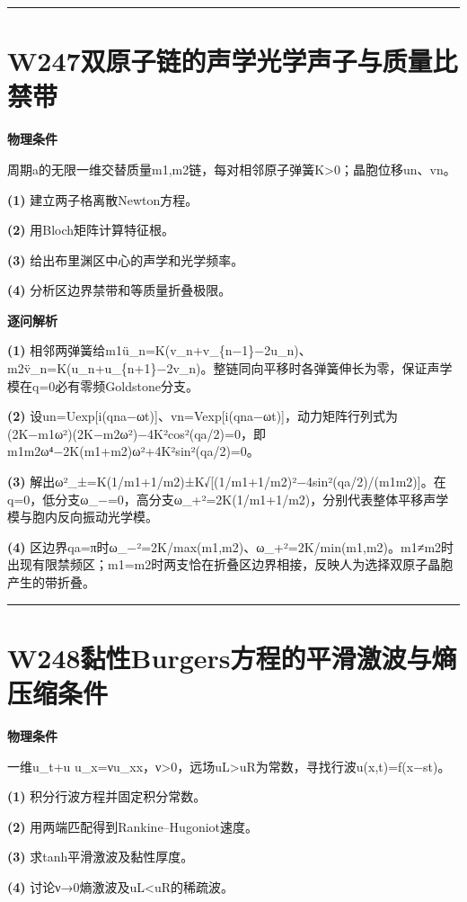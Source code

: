 \documentclass[UTF8,a4paper,11pt,oneside,openany]{ctexbook}
\begin{document}
\par\bigskip\hrule\bigskip
\section*{W247\quad 双原子链的声学光学声子与质量比禁带}
\textbf{物理条件}\par 周期a的无限一维交替质量m1,m2链，每对相邻原子弹簧K>0；晶胞位移un、vn。
\par\noindent\textbf{(1)} 建立两子格离散Newton方程。
\par\noindent\textbf{(2)} 用Bloch矩阵计算特征根。
\par\noindent\textbf{(3)} 给出布里渊区中心的声学和光学频率。
\par\noindent\textbf{(4)} 分析区边界禁带和等质量折叠极限。

\par\medskip\noindent\textbf{逐问解析}
\par\noindent\textbf{(1)} 相邻两弹簧给m1ü\_n=K(v\_n+v\_\{n−1\}−2u\_n)、m2v̈\_n=K(u\_n+u\_\{n+1\}−2v\_n)。整链同向平移时各弹簧伸长为零，保证声学模在q=0必有零频Goldstone分支。
\par\noindent\textbf{(2)} 设un=Uexp[i(qna−ωt)]、vn=Vexp[i(qna−ωt)]，动力矩阵行列式为(2K−m1ω²)(2K−m2ω²)−4K²cos²(qa/2)=0，即m1m2ω⁴−2K(m1+m2)ω²+4K²sin²(qa/2)=0。
\par\noindent\textbf{(3)} 解出ω²\_±=K(1/m1+1/m2)±K√[(1/m1+1/m2)²−4sin²(qa/2)/(m1m2)]。在q=0，低分支ω\_−=0，高分支ω\_+²=2K(1/m1+1/m2)，分别代表整体平移声学模与胞内反向振动光学模。
\par\noindent\textbf{(4)} 区边界qa=π时ω\_−²=2K/max(m1,m2)、ω\_+²=2K/min(m1,m2)。m1≠m2时出现有限禁频区；m1=m2时两支恰在折叠区边界相接，反映人为选择双原子晶胞产生的带折叠。

\par\bigskip\hrule\bigskip
\section*{W248\quad 黏性Burgers方程的平滑激波与熵压缩条件}
\textbf{物理条件}\par 一维u\_t+u u\_x=νu\_xx，ν>0，远场uL>uR为常数，寻找行波u(x,t)=f(x−st)。
\par\noindent\textbf{(1)} 积分行波方程并固定积分常数。
\par\noindent\textbf{(2)} 用两端匹配得到Rankine–Hugoniot速度。
\par\noindent\textbf{(3)} 求tanh平滑激波及黏性厚度。
\par\noindent\textbf{(4)} 讨论ν→0熵激波及uL<uR的稀疏波。
\end{document}
